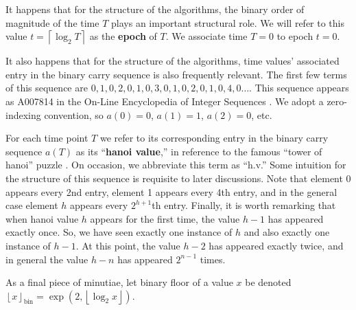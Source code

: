 It happens that for the structure of the algorithms, the binary order of magnitude of the time $T$ plays an important structural role.
We will refer to this value $t = \left\lceil \log_2 T \right\rceil$ as the \textbf{epoch} of $T$.
We associate time $T=0$ to epoch $t=0$.

It also happens that for the structure of the algorithms, time values' associated entry in the binary carry sequence is also frequently relevant.
The first few terms of this sequence are $0, 1, 0, 2, 0, 1, 0, 3, 0, 1, 0, 2, 0, 1, 0, 4, 0 \ldots$.
This sequence appears as A007814 in the On-Line Encyclopedia of Integer Sequences \citep{oeis}.
We adopt a zero-indexing convention, so $a(0) = 0$, $a(1) = 1$, $a(2) = 0$, etc.

For each time point $T$ we refer to its corresponding entry in the binary carry sequence $a(T)$ as its ``\textbf{hanoi value},'' in reference to the famous ``tower of hanoi'' puzzle \citep{lucas1889jeux}.
On occasion, we abbreviate this term as ``h.v.''
Some intuition for the structure of this sequence is requisite to later discussions.
Note that element 0 appears every 2nd entry, element 1 appears every 4th entry, and in the general case element $h$ appears every $2^{h+1}$th entry.
Finally, it is worth remarking that when hanoi value $h$ appears for the first time, the value $h - 1$ has appeared exactly once.
So, we have seen exactly one instance of $h$ and also exactly one instance of $h - 1$.
At this point, the value $h - 2$ has appeared exactly twice, and in general the value $h - n$ has appeared $2^{n - 1}$ times.

As a final piece of minutiae, let binary floor of a value $x$ be denoted $\left\lfloor x \right\rfloor_\mathrm{bin} = \exp(2, \left\lfloor \log_2 x \right\rfloor)$.
